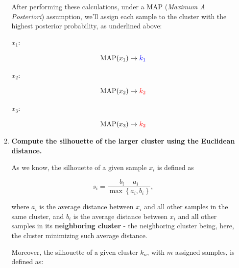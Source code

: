 \documentclass[12pt]{article}
\begin{document}
\begin{enumerate}[leftmargin=\labelsep]
\begin{enumerate}[leftmargin=\labelsep]
\begin{paracol}{3}
                \end{paracol}

                After performing these calculations, under a MAP (\emph{Maximum A Posteriori})
                assumption, we'll assign each sample to the cluster with the highest posterior
                probability, as underlined above:

                \begin{paracol}{3}
                  \setlength{\columnseprule}{1pt}
                  \def\columnseprulecolor{\color{black}}
                  \centering

                  $x_1$:

                  $$
                    \text{MAP}(x_1) \mapsto \textcolor{blue}{k_1}
                  $$

                  \switchcolumn

                  $x_2$:

                  $$
                    \text{MAP}(x_2) \mapsto \textcolor{red}{k_2}
                  $$

                  \switchcolumn

                  $x_3$:

                  $$
                    \text{MAP}(x_3) \mapsto \textcolor{red}{k_2}
                  $$

                \end{paracol}

                \pagebreak

          \item \textbf{Compute the silhouette of the larger cluster using the Euclidean distance.}

                As we know, the silhouette of a given sample $x_i$ is defined as

                \begin{equation*}
                  s_i = \frac{b_i - a_i}{\max\left\{a_i, b_i\right\}},
                \end{equation*}

                where $a_i$ is the average distance between $x_i$ and all other samples
                in the same cluster, and $b_i$ is the average distance between $x_i$ and all
                other samples in its \textbf{neighboring cluster} - the neighboring
                cluster being, here, the cluster minimizing such average distance.

                Moreover, the silhouette of a given cluster $k_n$, with $m$ assigned samples,
                is defined as:


\end{enumerate}
\end{enumerate}
\end{document}
